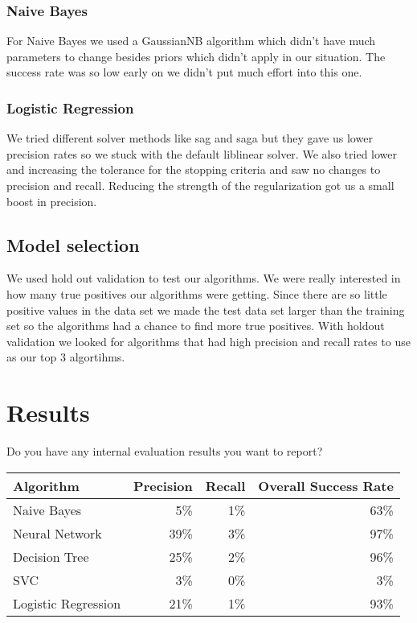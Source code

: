 \documentclass[11pt,a4paper]{article}
\begin{document}
		\subsubsection{Naive Bayes}
			For Naive Bayes we used a GaussianNB algorithm which didn't have much parameters to change besides priors which didn't apply in our situation.
			The success rate was so low early on we didn't put much effort into this one.

		\subsubsection{Logistic Regression}
			We tried different solver methods like sag and saga but they gave us lower precision rates so we stuck with the default liblinear solver.
			We also tried lower and increasing the tolerance for the stopping criteria and saw no changes to precision and recall.
			Reducing the strength of the regularization got us a small boost in precision.

	\subsection{Model selection}
		We used hold out validation to test our algorithms.
		We were really interested in how many true positives our algorithms were getting.
		Since there are so little positive values in the data set we made the test data set larger than the training set so the algorithms had a chance to find more true positives.
		With holdout validation we looked for algorithms that had high precision and recall rates to use as our top 3 algortihms.

\section{Results}
	Do you have any internal evaluation results you want to report?

	\begin{tabular}{ | l | r | r | r | }
		\hline
		Algorithm & Precision & Recall & Overall Success Rate \\
		\hline
		Naive Bayes & 5\% & 1\% & 63\% \\
		\hline
		Neural Network & 39\% & 3\% & 97\% \\
		\hline
		Decision Tree & 25\% & 2\% & 96\% \\
		\hline
		SVC & 3\% & 0\% & 3\% \\
		\hline
		Logistic Regression & 21\% & 1\% & 93\% \\
		\hline
	\end{tabular}
\end{document}
